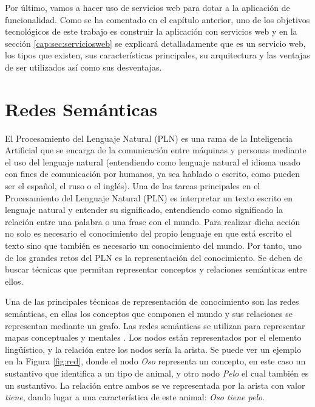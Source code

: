 Por último, vamos a hacer uso de servicios web para dotar a la aplicación de funcionalidad. Como se ha comentado en el capítulo anterior, uno de los objetivos tecnológicos de este trabajo es construir la aplicación con servicios web y en la sección \ref{cap:sec:serviciosweb} se explicará detalladamente que es un servicio web, los tipos que existen, sus características principales, su arquitectura y las ventajas de ser utilizados así como sus desventajas.


\section{Redes Semánticas}
\label{cap:sec:lenguajenatural}
El Procesamiento del Lenguaje Natural (PLN) es una rama de la Inteligencia Artificial que se encarga de la comunicación entre máquinas y personas mediante el uso del lenguaje natural (entendiendo como lenguaje natural el idioma usado con fines de comunicación por humanos, ya sea hablado o escrito, como pueden ser el español, el ruso o el inglés). Una de las tareas principales en el Procesamiento del Lenguaje Natural (PLN) es interpretar un texto escrito en lenguaje natural y entender su significado, entendiendo como significado la relación entre una palabra o una frase con el mundo. Para realizar dicha acción no solo es necesario el conocimiento del propio lenguaje en que está escrito el texto sino que también es necesario un conocimiento del mundo. Por tanto, uno de los grandes retos del PLN es la representación del conocimiento. Se deben de buscar técnicas que permitan representar conceptos y relaciones semánticas entre ellos. 

Una de las principales técnicas de representación de conocimiento son las redes semánticas, en ellas los conceptos que componen el mundo y sus relaciones se representan mediante un grafo. Las redes semánticas se utilizan para representar mapas conceptuales y mentales \citep{redSemantica2018}.
Los nodos están representados por el elemento lingüístico, y la relación entre los nodos sería la arista. Se puede ver un ejemplo en la Figura \ref{fig:red}, donde el nodo \textit{Oso} representa un concepto, en este caso un sustantivo que identifica a un tipo de animal, y otro nodo \textit{Pelo} el cual también es un sustantivo. La relación entre ambos se ve representada por la arista con valor \textit{tiene}, dando lugar a una característica de este animal: \textit{Oso tiene pelo}.


